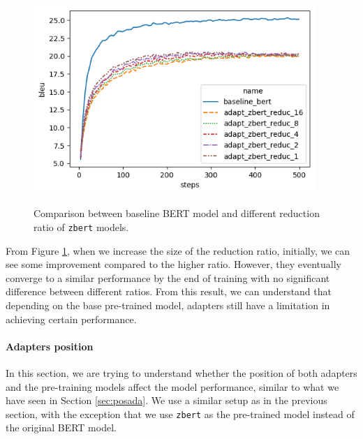 \begin{figure}[]
    {\includegraphics[width=0.95\textwidth]{img/adapter_zbert_ratio.png}}
    \centering
    \caption{Comparison between baseline BERT model and different reduction ratio of \texttt{zbert} models.}
    \label{img:adapter_zbert_ratio}
\end{figure}

From Figure \ref{img:adapter_zbert_ratio}, when we increase the size of the reduction ratio, initially, we can see some improvement compared to the higher ratio. However, they eventually converge to a similar performance by the end of training with no significant difference between different ratios. From this result, we can understand that depending on the base pre-trained model, adapters still have a limitation in achieving certain performance.

\paragraph{Adapters position}
In this section, we are trying to understand whether the position of both adapters and the pre-training models affect the model performance, similar to what we have seen in Section \ref{sec:posada}. We use a similar setup as in the previous section, with the exception that we use \texttt{zbert} as the pre-trained model instead of the original BERT model.

